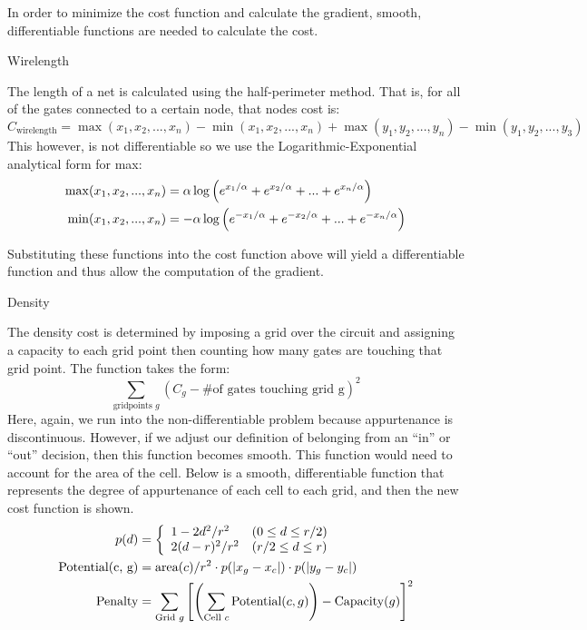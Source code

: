 \documentclass[9pt]{extarticle}
\begin{document}
\begin{homeworkProblem}

In order to minimize the cost function and calculate the gradient, smooth, differentiable functions are needed to calculate the cost.

\begin{homeworkSection}{Wirelength}

    The length of a net is calculated using the half-perimeter method. That is, for all of the gates connected to a certain node, that nodes cost is: $$ C_{\textrm{wirelength}} = \max(x_1, x_2, ..., x_n) - \min(x_1, x_2, ..., x_n) + \max(y_1, y_2, ..., y_n) - \min(y_1, y_2, ..., y_3) $$ This however, is not differentiable so we use the Logarithmic-Exponential analytical form for max:
    \begin{align*}
    \centering
        \max(x_1, x_2, ..., x_n) &= \alpha \log\left(e^{x_1/\alpha} + e^{x_2/\alpha} + ... + e^{x_n/\alpha}\right)\\
        \min(x_1, x_2, ..., x_n) &= -\alpha \log\left(e^{-x_1/\alpha} + e^{-x_2/\alpha} + ... + e^{-x_n/\alpha}\right)
    \end{align*}

    Substituting these functions into the cost function above will yield a differentiable function and thus allow the computation of the gradient.
    
\end{homeworkSection}

\begin{homeworkSection}{Density}

    The density cost is determined by imposing a grid over the circuit and assigning a capacity to each grid point then counting how many gates are touching that grid point. The function takes the form: $$ \sum_{\textrm{gridpoints } g} \left( C_g - \textrm{\# of gates touching grid g}\right)^2 $$ Here, again, we run into the non-differentiable problem because appurtenance is discontinuous. However, if we adjust our definition of belonging from an ``in'' or ``out''
    decision, then this function becomes smooth. This function would need to account for the area of the cell. Below is a smooth, differentiable function that represents the degree of appurtenance of each cell to each grid, and then the new cost function is shown.
    \begin{align*}
    \centering
        p(d) &= \left\{
            \begin{array}{ll}
                1 - 2d^2/r^2 & (0 \le d \le r/2)\\
                2(d-r)^2/r^2 & (r/2 \le d \le r)
            \end{array}
            \right.\\
        \textrm{Potential(c, g)} &=  \textrm{area}(c)/r^2 \cdot p(|x_g - x_c|) \cdot p(|y_g - y_c|)\\
        \textrm{Penalty} &= \sum_{\textrm{Grid } g} \left[ \left( \sum_{\textrm{Cell } c} \textrm{Potential}(c,g)\right) - \textrm{Capacity}(g)\right]^2
    \end{align*}
\end{homeworkSection}


\end{homeworkProblem}
\end{document}
